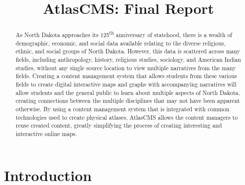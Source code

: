 \documentclass[11pt, draftcls, conference, onecolumn]{IEEEtran}
\begin{document}
\title{AtlasCMS: Final Report}

\author{


\and


}

\maketitle

\begin{abstract}

As North Dakota approaches its 125\textsuperscript{th} anniversary of statehood, there is a wealth of demographic, economic, and social data available relating to the diverse religious, ethnic, and social groups of North Dakota. However, this data is scattered across many fields, including anthropology, history, religious studies, sociology, and American Indian studies, without any single source location to view multiple narratives from the many fields. Creating a content management system that allows students from these various fields to create digital interactive maps and graphs with accompanying narratives will allow students and the general public to learn about multiple aspects of North Dakota, creating connections between the multiple disciplines that may not have been apparent otherwise. By using a content management system that is integrated with common technologies used to create physical atlases, AtlasCMS allows the content managers to reuse created content, greatly simplifying the process of creating interesting and interactive online maps.

\end{abstract}

\IEEEpeerreviewmaketitle

\section{Introduction}
\end{document}
